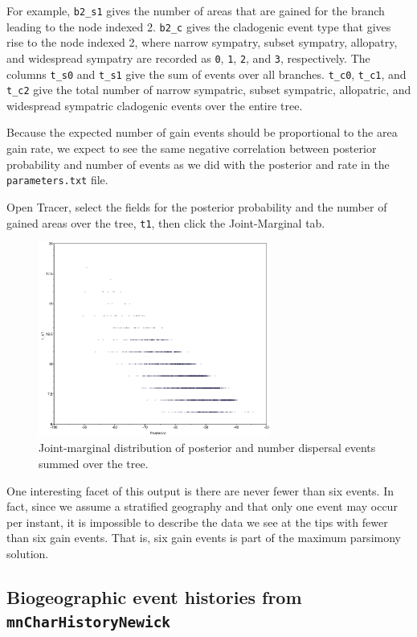 For example, {\tt b2\_s1} gives the number of areas that are gained for the branch leading to the node indexed 2.
{\tt b2\_c} gives the cladogenic event type that gives rise to the node indexed 2, where narrow sympatry, subset sympatry, allopatry, and widespread sympatry are recorded as {\tt 0}, {\tt 1}, {\tt 2}, and {\tt 3}, respectively. The columns {\tt t\_s0} and {\tt t\_s1} give the sum of events over all branches. {\tt t\_c0}, {\tt t\_c1}, and {\tt t\_c2} give the total number of narrow sympatric, subset sympatric, allopatric, and widespread sympatric cladogenic events over the entire tree.

Because the expected number of gain events should be proportional to the area gain rate, we expect to see the same negative correlation between posterior probability and number of events as we did with the posterior and rate in the {\tt parameters.txt} file.

Open Tracer, select the fields for the posterior probability and the number of gained areas over the tree, {\tt t1}, then click the Joint-Marginal tab.

\begin{figure}[H]
\centering
\includegraphics[width=3in]{../RB_Biogeography_Tutorial/figures/joint_ngain_posterior}
\caption{Joint-marginal distribution of posterior and number dispersal events summed over the tree.}
\end{figure}

One interesting facet of this output is there are never fewer than six events.
In fact, since we assume a stratified geography and that only one event may occur per instant, it is impossible to describe the data we see at the tips with fewer than six gain events.
That is, six gain events is part of the maximum parsimony solution.

\subsection{Biogeographic event histories from {\tt mnCharHistoryNewick}}

